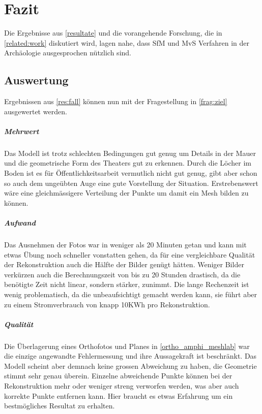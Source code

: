 \chapter{Fazit}
	Die Ergebnisse aus \autoref{resultate} und die vorangehende Forschung, die in \autoref{related:work} diskutiert wird, lagen nahe, dass SfM und MvS Verfahren in der Archäologie ausgesprochen nützlich sind.
	
	\section{Auswertung}	
		Ergebnissen aus \autoref{res:fall} können nun mit der Fragestellung in \autoref{frag:ziel} ausgewertet werden.
		
		\paragraph{Mehrwert}
			Das Modell ist trotz schlechten Bedingungen gut genug um Details in der Mauer und die geometrische Form des Theaters gut zu erkennen.
			Durch die Löcher im Boden ist es für Öffentlichkeitsarbeit vermutlich nicht gut genug, gibt aber schon so auch dem ungeübten Auge eine gute Vorstellung der Situation.
			Erstrebenswert wäre eine gleichmässigere Verteilung der Punkte um damit ein Mesh bilden zu können.
						
		\paragraph{Aufwand}
			Das Ausnehmen der Fotos war in weniger als 20 Minuten getan und kann mit etwas Übung noch schneller vonstatten gehen, da für eine vergleichbare Qualität der Rekonstruktion auch die Hälfte der Bilder genügt hätten.
			Weniger Bilder verkürzen auch die Berechnungszeit von bis zu 20 Stunden drastisch, da die benötigte Zeit nicht linear, sondern stärker, zunimmt.
			Die lange Rechenzeit ist wenig problematisch, da die unbeaufsichtigt gemacht werden kann, sie führt aber zu einem Stromverbrauch von knapp 10KWh pro Rekonstruktion.
						
		\paragraph{Qualität}
			Die Überlagerung eines Orthofotos und Planes in \autoref{ortho_amphi_meshlab} war die einzige angewandte Fehlermessung und ihre Aussagekraft ist beschränkt. Das Modell scheint aber demnach keine grossen Abweichung zu haben, die Geometrie stimmt sehr genau überein.
			Einzelne abweichende Punkte können bei der Rekonstruktion mehr oder weniger streng verworfen werden, was aber auch korrekte Punkte entfernen kann. Hier braucht es etwas Erfahrung um ein bestmögliches Resultat zu erhalten.
			
